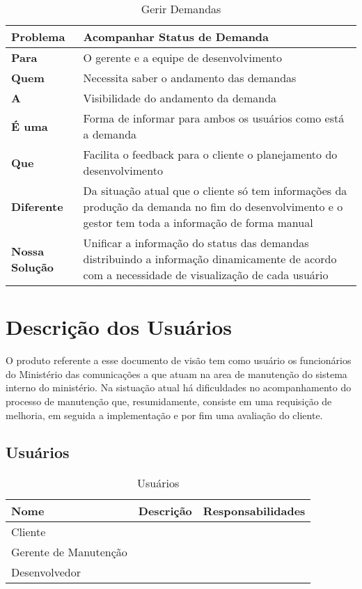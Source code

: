 \begin{table}[H]
\begin{tabular}{|l| p{11cm} |}
	\hline
	\textbf{Problema} & Acompanhar Status de Demanda\tabularnewline
	\hline
	\textbf{Para} & O gerente e a equipe de desenvolvimento\tabularnewline
	\hline
	\textbf{Quem} & Necessita saber o andamento das demandas\tabularnewline
	\hline
	\textbf{A} & Visibilidade do andamento da demanda\tabularnewline
	\hline
	\textbf{É uma} & Forma de informar para ambos os usuários como está a demanda\tabularnewline
	\hline
	\textbf{Que} & Facilita o feedback para o cliente o planejamento do desenvolvimento\tabularnewline
	\hline
	\textbf{Diferente} & Da situação atual que o cliente só tem informações da produção da demanda no fim do desenvolvimento e o gestor tem toda a informação de forma manual\tabularnewline
	\hline
	\textbf{Nossa Solução} & Unificar a informação do status das demandas distribuindo a informação dinamicamente de acordo com a necessidade de visualização de cada usuário\tabularnewline
	\hline
\end{tabular}
\caption{Gerir Demandas}
\label{Visao_Geral_Acompanhar_Status}
\end{table}

\section{Descrição dos Usuários}

O produto referente a esse documento de visão tem como usuário os funcionários do Ministério das comunicações a que atuam na area de manutenção do sistema interno do ministério. Na sistuação atual  há dificuldades no acompanhamento do processo de manutenção que, resumidamente, consiste em uma requisição de melhoria, em seguida a implementação e por fim uma avaliação do cliente. 

\subsection{Usuários}

\begin{table}[H]
\begin{tabular}{|l| p{7cm} | p{6cm} |}
	\hline
	\textbf{Nome} & \textbf{Descrição} & \textbf{Responsabilidades}\tabularnewline
	\hline
	Cliente & & \tabularnewline
	\hline
	Gerente de Manutenção & & \tabularnewline
	\hline
	Desenvolvedor & & \tabularnewline
	\hline
\end{tabular}
\caption{Usuários}
\label{Usuarios}
\end{table}

